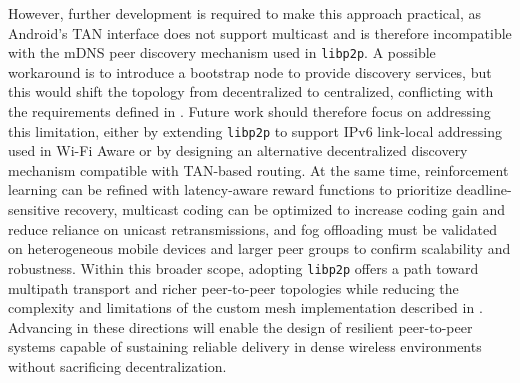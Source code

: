 \quad However, further development is required to make this approach practical, as Android’s TAN interface does not support multicast and is therefore incompatible with the mDNS peer discovery mechanism used in \texttt{libp2p}. A possible workaround is to introduce a bootstrap node to provide discovery services, but this would shift the topology from decentralized to centralized, conflicting with the requirements defined in \textbf{}. Future work should therefore focus on addressing this limitation, either by extending \texttt{libp2p} to support IPv6 link-local addressing used in Wi-Fi Aware or by designing an alternative decentralized discovery mechanism compatible with TAN-based routing. At the same time, reinforcement learning can be refined with latency-aware reward functions to prioritize deadline-sensitive recovery, multicast coding can be optimized to increase coding gain and reduce reliance on unicast retransmissions, and fog offloading must be validated on heterogeneous mobile devices and larger peer groups to confirm scalability and robustness. Within this broader scope, adopting \texttt{libp2p} offers a path toward multipath transport and richer peer-to-peer topologies while reducing the complexity and limitations of the custom mesh implementation described in \textbf{}. Advancing in these directions will enable the design of resilient peer-to-peer systems capable of sustaining reliable delivery in dense wireless environments without sacrificing decentralization.